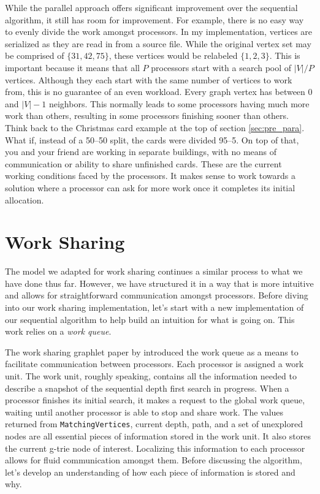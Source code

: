 \documentclass[12pt,twoside]{reedthesis}
\begin{document}
While the parallel approach offers significant improvement over the sequential algorithm, it still has room for improvement. For example, there is no easy way to evenly divide the work amongst processors. In my implementation, vertices are serialized as they are read in from a source file. While the original vertex set may be comprised of $\{31,42,75\}$, these vertices would be relabeled $\{1,2,3\}$. This is important because it means that all $P$ processors start with a search pool of $|V| / P$ vertices. Although they each start with the same number of vertices to work from, this is no guarantee of an even workload. Every graph vertex has between $0$ and $|V|-1$ neighbors. This normally leads to some processors having much more work than others, resulting in some processors finishing sooner than others. Think back to the Christmas card example at the top of section \ref{sec:pre_para}. What if, instead of a 50--50 split, the cards were divided 95--5. On top of that, you and your friend are working in separate buildings, with no means of communication or ability to share unfinished cards. These are the current working conditions faced by the processors. It makes sense to work towards a solution where a processor can ask for more work once it completes its initial allocation.
\section{Work Sharing}
The model we adapted for work sharing continues a similar process to what we have done thus far. However, we have structured it in a way that is more intuitive and allows for straightforward communication amongst processors. Before diving into our work sharing implementation, let's start with a new implementation of our sequential algorithm to help build an intuition for what is going on. This work relies on a \textit{work queue}. 

The work sharing graphlet paper by \citeauthor{par_t} \cite{par_t}  introduced the work queue as a means to facilitate communication between processors. Each processor is assigned a work unit. The work unit, roughly speaking, contains all the information needed to describe a snapshot of the sequential depth first search in progress. When a processor finishes its initial search, it makes a request to the global work queue, waiting until another processor is able to stop and share work. The values returned from \texttt{MatchingVertices}, current depth, path, and a set of unexplored nodes are all essential pieces of information stored in the work unit. It also stores the current g-trie node of interest. Localizing this information to each processor allows for fluid communication amongst them. Before discussing the algorithm, let's develop an understanding of how each piece of information is stored and why.
\end{document}

